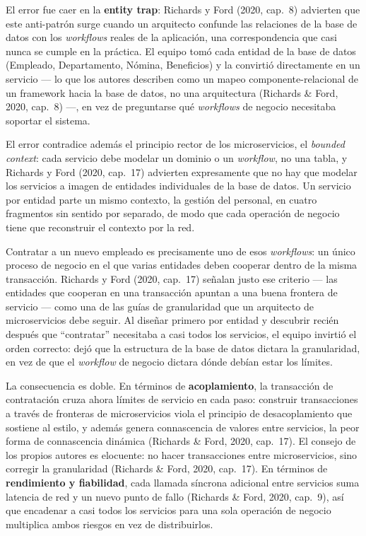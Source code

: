 
El error fue caer en la \textbf{entity trap}: Richards y Ford (2020, cap.~8)
advierten que este anti-patrón surge cuando un arquitecto confunde las relaciones
de la base de datos con los \emph{workflows} reales de la aplicación, una
correspondencia que casi nunca se cumple en la práctica. El equipo tomó cada
entidad de la base de datos (Empleado, Departamento, Nómina, Beneficios) y la
convirtió directamente en un servicio --- lo que los autores describen como un
mapeo componente-relacional de un framework hacia la base de datos, no una
arquitectura (Richards \& Ford, 2020, cap.~8) ---, en vez de preguntarse qué
\emph{workflows} de negocio necesitaba soportar el sistema.

El error contradice además el principio rector de los microservicios, el
\emph{bounded context}: cada servicio debe modelar un dominio o un
\emph{workflow}, no una tabla, y Richards y Ford (2020, cap.~17) advierten
expresamente que no hay que modelar los servicios a imagen de entidades
individuales de la base de datos. Un servicio por entidad parte un mismo
contexto, la gestión del personal, en cuatro fragmentos sin sentido por
separado, de modo que cada operación de negocio tiene que reconstruir el
contexto por la red.

Contratar a un nuevo empleado es precisamente uno de esos \emph{workflows}: un
único proceso de negocio en el que varias entidades deben cooperar dentro de la
misma transacción. Richards y Ford (2020, cap.~17) señalan justo ese criterio ---
las entidades que cooperan en una transacción apuntan a una buena frontera de
servicio --- como una de las guías de granularidad que un arquitecto de
microservicios debe seguir. Al diseñar primero por entidad y descubrir recién
después que ``contratar'' necesitaba a casi todos los servicios, el equipo
invirtió el orden correcto: dejó que la estructura de la base de datos dictara la
granularidad, en vez de que el \emph{workflow} de negocio dictara dónde debían
estar los límites.

La consecuencia es doble. En términos de \textbf{acoplamiento}, la transacción de
contratación cruza ahora límites de servicio en cada paso: construir
transacciones a través de fronteras de microservicios viola el principio de
desacoplamiento que sostiene al estilo, y además genera connascencia de valores
entre servicios, la peor forma de connascencia dinámica (Richards \& Ford, 2020,
cap.~17). El consejo de los propios autores es elocuente: no hacer
transacciones entre microservicios, sino corregir la granularidad (Richards \&
Ford, 2020, cap.~17). En términos de \textbf{rendimiento y fiabilidad}, cada llamada síncrona adicional
entre servicios suma latencia de red y un nuevo punto de fallo (Richards \& Ford,
2020, cap.~9), así que encadenar a casi todos los servicios para una sola
operación de negocio multiplica ambos riesgos en vez de distribuirlos.

